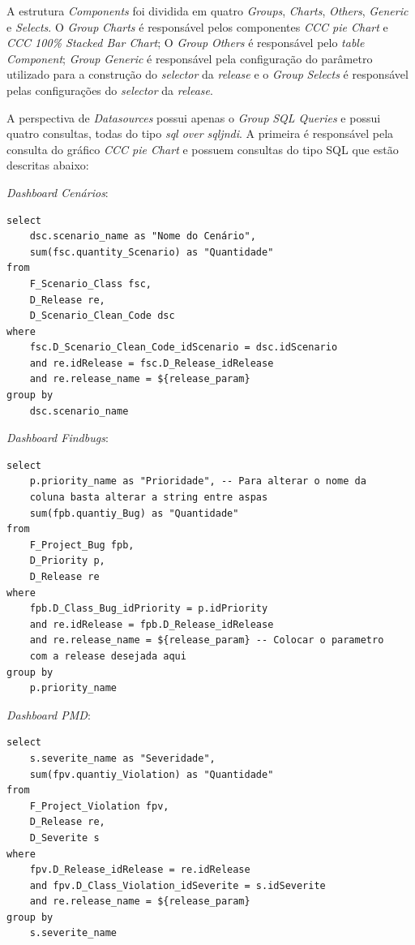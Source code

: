 \begin{apendicesenv}
A estrutura \textit{Components} foi dividida em quatro \textit{Groups}, \textit{Charts}, \textit{Others}, \textit{Generic} e \textit{Selects}. O \textit{Group} \textit{Charts} é responsável pelos componentes \textit{CCC pie Chart} e \textit{CCC 100\% Stacked Bar Chart}; O \textit{Group} \textit{Others} é responsável pelo \textit{table Component}; \textit{Group} \textit{Generic} é responsável pela configuração do parâmetro utilizado para a construção do \textit{selector} da \textit{release}  e o \textit{Group} \textit{Selects} é responsável pelas configurações do \textit{selector} da \textit{release}.

A perspectiva de \textit{Datasources} possui apenas o \textit{Group} \textit{SQL Queries} e possui quatro consultas, todas do  tipo \textit{sql over sqljndi}. A primeira é responsável pela consulta do gráfico \textit{CCC pie Chart} e possuem consultas do tipo SQL que estão descritas abaixo:

\textit{Dashboard Cenários}:
{\color{blue}
\begin{verbatim}
select 
    dsc.scenario_name as "Nome do Cenário",
	sum(fsc.quantity_Scenario) as "Quantidade"
from
	F_Scenario_Class fsc,
	D_Release re,
	D_Scenario_Clean_Code dsc
where
	fsc.D_Scenario_Clean_Code_idScenario = dsc.idScenario
	and re.idRelease = fsc.D_Release_idRelease
	and re.release_name = ${release_param}
group by
	dsc.scenario_name
\end{verbatim}
}

\textit{Dashboard Findbugs}:
{\color{blue}
\begin{verbatim}
select 
    p.priority_name as "Prioridade", -- Para alterar o nome da 
    coluna basta alterar a string entre aspas
	sum(fpb.quantiy_Bug) as "Quantidade"
from 
	F_Project_Bug fpb,
	D_Priority p,
	D_Release re 
where	
	fpb.D_Class_Bug_idPriority = p.idPriority
	and re.idRelease = fpb.D_Release_idRelease
	and re.release_name = ${release_param} -- Colocar o parametro 
	com a release desejada aqui
group by 
	p.priority_name
\end{verbatim}
}

\textit{Dashboard PMD}:
{\color{blue}
\begin{verbatim}
select 
    s.severite_name as "Severidade",
	sum(fpv.quantiy_Violation) as "Quantidade"
from 
	F_Project_Violation fpv,
	D_Release re,
	D_Severite s
where
	fpv.D_Release_idRelease = re.idRelease
	and fpv.D_Class_Violation_idSeverite = s.idSeverite
	and re.release_name = ${release_param}
group by
	s.severite_name
\end{verbatim}
}


\end{apendicesenv}
